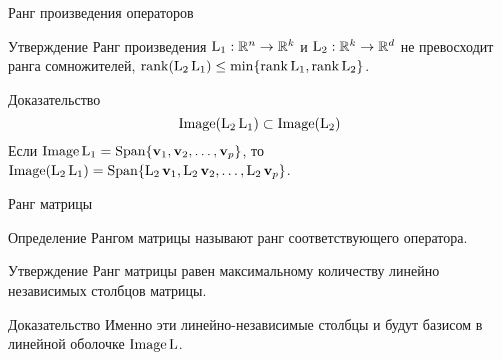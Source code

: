 \begin{frame}{Ранг произведения операторов}

\begin{block}{Утверждение}
Ранг произведения $\operatorname{L}_1: \mathbb{R}^n \to \mathbb{R}^k$ и $\operatorname{L}_2: \mathbb{R}^k \to \mathbb{R}^d$ не превосходит ранга сомножителей, $\rank (\operatorname{L}_2 \operatorname{L}_1) \leq \min \{\rank \operatorname{L}_1, \rank \operatorname{L}_2 \}$.
\end{block}

\pause
\begin{block}{Доказательство}
\[
\operatorname{Image}(\operatorname{L}_2\operatorname{L}_1) \subset \operatorname{Image}(\operatorname{L}_2)  
\]
\pause
Если $\operatorname{Image} \operatorname{L}_1 = \operatorname{Span}\{ \mathbf{v}_1, \mathbf{v}_2, \ldots, \mathbf{v}_p \}$, то $\operatorname{Image} (\operatorname{L}_2 \operatorname{L}_1 ) =\operatorname{Span}\{ \operatorname{L}_2 \mathbf{v}_1, \operatorname{L}_2 \mathbf{v}_2, \ldots, \operatorname{L}_2 \mathbf{v}_p \}$.

\end{block}
\end{frame}
  






\begin{frame}{Ранг матрицы}

\begin{block}{Определение}
\alert{Рангом матрицы} называют ранг соответствующего оператора.
\end{block}

\pause

\begin{block}{Утверждение}
Ранг матрицы равен максимальному количеству линейно независимых столбцов матрицы. 
\end{block}

\pause
\begin{block}{Доказательство}
Именно эти линейно-независимые столбцы и будут базисом в линейной оболочке $\operatorname{Image} \operatorname{L}$. 
\end{block}


\end{frame}




